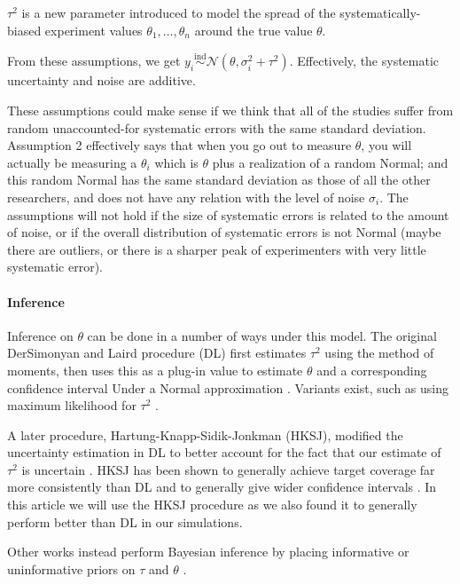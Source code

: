 \documentclass[12pt]{article}
\begin{document}
$\tau^2$ is a new parameter introduced to model the spread of the systematically-biased experiment values $\theta_1,\ldots,\theta_n$ around the true value $\theta$.

From these assumptions, we get $y_i\overset{\mathrm{ind}}{\sim}\mathcal{N}(\theta,\sigma_i^2+\tau^2)$. Effectively, the systematic uncertainty and noise are additive.

These assumptions could make sense if we think that all of the studies suffer from random unaccounted-for systematic errors with the same standard deviation. Assumption 2 effectively says that when you go out to measure $\theta$, you will actually be measuring a $\theta_i$ which is $\theta$ plus a realization of a random Normal; and this random Normal has the same standard deviation as those of all the other researchers, and does not have any relation with the level of noise $\sigma_i$. The assumptions will not hold if the size of systematic errors is related to the amount of noise, or if the overall distribution of systematic errors is not Normal (maybe there are outliers, or there is a sharper peak of experimenters with very little systematic error).

\paragraph{Inference}\label{inference}

Inference on $\theta$ can be done in a number of ways under this model. The original DerSimonyan and Laird procedure (DL) first estimates $\tau^2$ using the method of moments, then uses this as a plug-in value to estimate $\theta$ and a corresponding confidence interval Under a Normal approximation \citep{dersimonian1986meta}. Variants exist, such as using maximum likelihood for $\tau^2$ \citep{dersimonian1986meta,jackson2010does}.

A later procedure, Hartung-Knapp-Sidik-Jonkman (HKSJ), modified the uncertainty estimation in DL to better account for the fact that our estimate of $\tau^2$ is uncertain \citep{hartung1999alternative,sidik2002simple}. HKSJ has been shown to generally achieve target coverage far more consistently than DL \citep{inthout2014hartung} and to generally give wider confidence intervals \citep{wiksten2016hartung}. In this article we will use the HKSJ procedure as we also found it to generally perform better than DL in our simulations.

Other works instead perform Bayesian inference by placing informative or uninformative priors on $\tau$ and $\theta$ \citep{sutton2001bayesian}.
\end{document}
